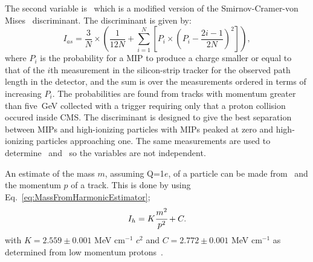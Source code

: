 The second variable is \ias\ which is a modified version of the Smirnov-Cramer-von Mises~\cite{Eadie, James} discriminant.
The discriminant is given by:
\begin{equation}
 I_{as} = \frac{3}{N} \times \left(
   \frac{1}{12N} + \sum_{i=1}^N
   \left[
   P_i \times \left( P_i - \frac{2i-1}{2N} \right)^2 \right] \right),
\end{equation}
where $P_i$ is the probability for a MIP to
produce a charge smaller or equal to that of the $i$th measurement in the silicon-strip tracker
for the observed path length in the detector, and the sum is over the
measurements ordered in terms of increasing $P_i$. The probabilities are found from tracks with momentum greater than five~GeV collected with a trigger requiring only
that a proton collision occured inside CMS. The discriminant is designed to give the best separation between MIPs and high-ionizing particles
with MIPs peaked at zero and high-ionizing particles approaching one. The same measurements are used to determine \ih\ and \ias\ so the variables are not independent. 

An estimate of the mass $m$, assuming Q=1$e$, of a particle can be made from \ih\ and the momentum $p$ of a track. This is done by using Eq.~\ref{eq:MassFromHarmonicEstimator};
\begin{equation}
I_h= K\cfrac{m^2}{p^2}+C.
\label{eq:MassFromHarmonicEstimator}
\end{equation}
with  $K=2.559 \pm 0.001$ MeV cm$^{-1}$ $c^2$ and $C=2.772 \pm 0.001$ MeV cm$^{-1}$ as determined from low momentum protons~\cite{Khachatryan:2011ts}.
